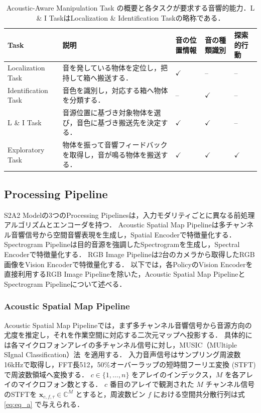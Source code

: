 \documentclass{article}
\begin{document}
	\begin{table}[t]
		\centering
		\scriptsize
		\setlength{\tabcolsep}{3pt}
		\caption{Acoustic-Aware Manipulation Task の概要と各タスクが要求する音響的能力．L \& I TaskはLocalization \& Identification Taskの略称である．}
		\label{tab:tasks}
		\begin{tabular}{p{} p{} >{\centering\arraybackslash}p{} >{\centering\arraybackslash}p{} >{\centering\arraybackslash}p{}}
			\hline
			Task & 説明 & 音の位置情報 & 音の種類識別 & 探索的行動 \\
			\hline
			Localization Task & 音を発している物体を定位し，把持して箱へ搬送する． & $\checkmark$ & -- & -- \\
			Identification Task & 音色を識別し，対応する箱へ物体を分類する． & -- & $\checkmark$ & -- \\
			L \& I Task & 音源位置に基づき対象物体を選び，音色に基づき搬送先を決定する． & $\checkmark$ & $\checkmark$ & -- \\
			Exploratory Task & 物体を振って音響フィードバックを取得し，音が鳴る物体を搬送する． & $\checkmark$ & $\checkmark$ & $\checkmark$ \\
			\hline
		\end{tabular}
	\end{table}




\subsection{Processing Pipeline}
\label{sec:pipelines}
S2A2 Modelの3つのProcessing Pipelinesは，入力モダリティごとに異なる前処理アルゴリズムとエンコーダを持つ．
Acoustic Spatial Map Pipelineは多チャンネル音響信号から空間音響表現を生成し，Spatial Encoderで特徴量化する．
Spectrogram Pipelineは目的音源を強調したSpectrogramを生成し，Spectral Encoderで特徴量化する．
RGB Image Pipelineは2台のカメラから取得したRGB画像をVision Encoderで特徴量化する．
以下では，各PolicyのVision Encoderを直接利用するRGB Image Pipelineを除いた，Acoustic Spatial Map PipelineとSpectrogram Pipelineについて述べる．




\subsubsection{Acoustic Spatial Map Pipeline}
\label{sec:doa}
	Acoustic Spatial Map Pipelineでは，まず多チャンネル音響信号から音源方向の尤度を推定し，それを作業空間に対応する二次元マップへ投影する．
	具体的には各マイクロフォンアレイの多チャンネル信号に対し，MUSIC（MUltiple SIgnal Classification）法~\citep{schmidt1986music}を適用する．
	入力音声信号はサンプリング周波数16kHzで取得し，FFT長512，50\%オーバーラップの短時間フーリエ変換 (STFT) で周波数領域へ変換する．
	$c\in\{1,\ldots,n\}$ をアレイのインデックス，$M$ を各アレイのマイクロフォン数とする．
	$c$ 番目のアレイで観測された $M$ チャンネル信号のSTFTを $\mathbf{x}_{c,f,\tau}\in\mathbb{C}^{M}$ とすると，周波数ビン $f$ における空間共分散行列は式 \ref{eq:eq_a} で与えられる．
\end{document}
